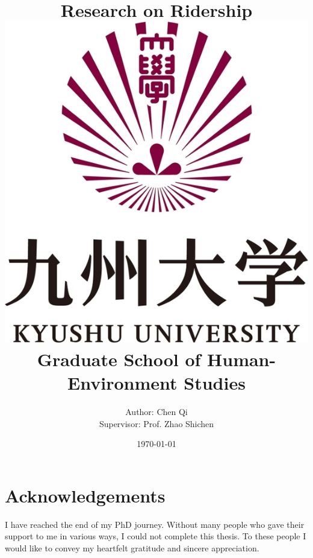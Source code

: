 \documentclass[12pt, oneside, a4paper]{book}
\begin{document}
\title{
	{Research on Ridership}\\
	{\vspace{2cm}}
	{\includegraphics[scale=0.2]{university.jpg}}\\
	{\vspace{1cm}}
	{\large Graduate School of Human-Environment Studies}\\
	{\vspace{1cm}}
}
\author{
	{Author: Chen Qi}\\
	{Supervisor: Prof. Zhao Shichen}
	{\vspace{1cm}}
}
\date{\today}
\maketitle

\tableofcontents
\frontmatter
\chapter{Acknowledgements}
%
I have reached the end of my PhD journey. Without many people who gave their support to me in various ways, I could not complete this thesis. To these people I would like to convey my heartfelt gratitude and sincere appreciation. 
\end{document}
